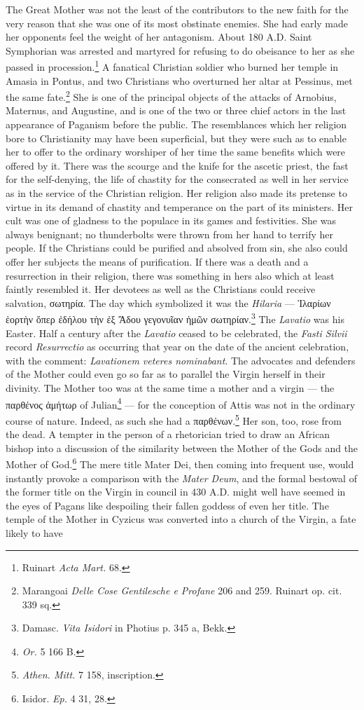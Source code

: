 \documentclass[a4paper, 11pt, oneside, polutonikogreek, english]{article}
\begin{document}
The Great Mother was not the least of the contributors to the new faith for the very reason that she was one of its most obstinate enemies. She had early made her opponents feel the weight of her antagonism. About 180 \textsc{A.D.} Saint Symphorian was arrested and martyred for refusing to do obeisance to her as she passed in procession.\footnote{Ruinart \emph{Acta Mart.} 68.} A fanatical Christian soldier who burned her temple in Amasia in Pontus, and two Christians who overturned her altar at Pessinus, met the same fate.\footnote{Marangoai \emph{Delle Cose Gentilesche e Profane} 206 and 259. Ruinart op. cit. 339 sq.} She is one of the principal objects of the attacks of Arnobius, Maternus, and Augustine, and is one of the two or three chief actors in the last appearance of Paganism before the public. The resemblances which her religion bore to Christianity may have been superficial, but they were such as to enable her to offer to the ordinary worshiper of her time the same benefits which were offered by it. There was the scourge and the knife for the ascetic priest, the fast for the self-denying, the life of chastity for the consecrated as well in her service as in the service of the Christian religion. Her religion also made its pretense to virtue in its demand of chastity and temperance on the part of its ministers. Her cult was one of gladness to the populace in its games and festivities. She was always benignant; no thunderbolts were thrown from her hand to terrify her people. If the Christians could be purified and absolved from sin, she also could offer her subjects the means of purification. If there was a death and a resurrection in their religion, there was something in hers also which at least faintly resembled it. Her devotees as well as the Christians could receive salvation, σωτηρία. The day which symbolized it was the \emph{Hilaria} --- Ἱλαρίων ἑορτὴν ὅπερ ἐδήλου τὴν ἐξ Ἄδου γεγονυῖαν ἡμῶν σωτηρίαν.\footnote{Damasc. \emph{Vita Isidori} in Photius p. 345 a, Bekk.} The \emph{Lavatio} was his Easter. Half a century after the \emph{Lavatio} ceased to be celebrated, the \emph{Fasti Silvii} record \emph{Resurrectio} as occurring that year on the date of the ancient celebration, with the comment: \emph{Lavationem veteres nominabant}. The advocates and defenders of the Mother could even go so far as to parallel the Virgin herself in their divinity. The Mother too was at the same time a mother and a virgin --- the παρθένος ἀμήτωρ of Julian\footnote{\emph{Or.} 5 166 B.} --- for the conception of Attis was not in the ordinary course of nature. Indeed, as such she had a παρθένων.\footnote{\emph{Athen. Mitt.} 7 158, inscription.} Her son, too, rose from the dead. A tempter in the person of a rhetorician tried to draw an African bishop into a discussion of the similarity between the Mother of the Gods and the Mother of God.\footnote{Isidor. \emph{Ep.} 4 31, 28.} The mere title Mater Dei, then coming into frequent use, would instantly provoke a comparison with the \emph{Mater Deum}, and the formal bestowal of the former title on the Virgin in council in 430 \textsc{A.D.} might well have seemed in the eyes of Pagans like despoiling their fallen goddess of even her title. The temple of the Mother in Cyzicus was converted into a church of the Virgin, a fate likely to have 
\end{document}
